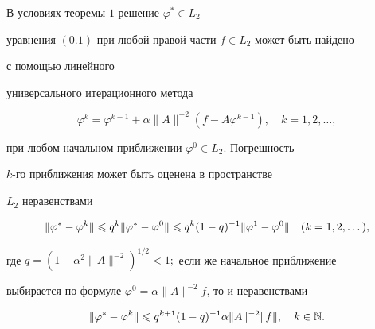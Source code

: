 \begin{thm}


В условиях теоремы $1$ решение $\varphi^* \in L_2$ 


уравнения $(0.1)$ при любой правой части $f\in L_2$ может быть найдено 


с помощью линейного


универсального итерационного метода


\begin{equation}


\varphi ^k=\varphi ^{k-1}+\alpha \|A\|^{-2}(f-A\varphi ^{k-1}),\quad


k=1,2,\dotsc ,


\end{equation}


при любом начальном приближении $\varphi^0\in L_2$. Погрешность


$k$-го приближения может быть оценена в пространстве


$L_2$ неравенствами


\begin{equation}


\|\varphi ^\ast -\varphi ^k\|\lea q^k\|\varphi ^\ast -\varphi ^0\|\lea


q^k(1-q)^{-1}\|\varphi ^1-\varphi ^0\| \quad (k=1,2,\dotsc),


\end{equation}


где $q=(1-\alpha ^2\|A\|^{-2})^{1/2}<1;$ если же начальное приближение 


выбирается по формуле $\varphi ^0=


\alpha \|A\|^{-2}f$, то и неравенствами


\begin{equation}


\|\varphi ^\ast -\varphi ^k\|\lea q^{k+1}(1-q)^{-1}


\alpha \|A\|^{-2}\|f\|,\quad k\in \N.


\end{equation}


\end{thm} 





